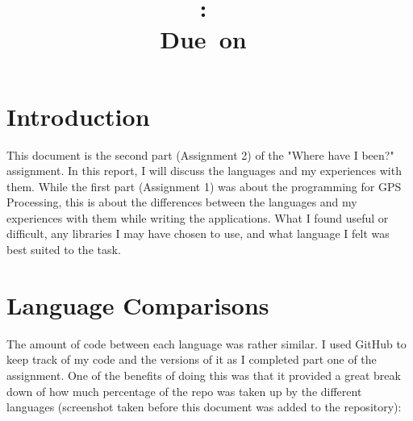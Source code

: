 \documentclass{article}
\title{
\vspace{2in}
\textmd{\textbf{\hmwkClass:\ \hmwkTitle}}\\
\normalsize\vspace{0.1in}\small{Due\ on\ \hmwkDueDate}\\
\vspace{3in}
}
\author{\textbf{\hmwkAuthorName}}
\date{} %
\begin{document}
\maketitle



\newpage
\tableofcontents
\newpage



\section{Introduction}
This document is the second part (Assignment 2\cite{assignment2}) of the "Where have I been?" assignment. In this report, I will discuss the languages and my experiences with them. While the first part (Assignment 1\cite{assignment1}) was about the programming for GPS Processing, this is about the differences between the languages and my experiences with them while writing the applications. What I found useful or difficult, any libraries I may have chosen to use, and what language I felt was best suited to the task.



\section{Language Comparisons}

The amount of code between each language was rather similar. I used GitHub to keep track of my code and the versions of it as I completed part one of the assignment. One of the benefits of doing this was that it provided a great break down of how much percentage of the repo was taken up by the different languages (screenshot taken before this document was added to the repository):
\end{document}
